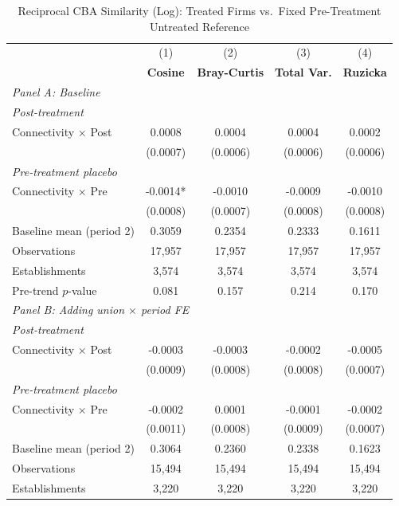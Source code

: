 \begin{table}[H]
\centering
\caption{Reciprocal CBA Similarity (Log): Treated Firms vs.\ Fixed Pre-Treatment Untreated Reference}
\label{tab:treated_pretreat_ref_ln_cba_similarity}
\scriptsize
\setlength{\tabcolsep}{8pt}
\begin{tabular}{lcccc}
\toprule\toprule
 & (1) & (2) & (3) & (4) \\
 & \textbf{Cosine} & \textbf{Bray-Curtis} & \textbf{Total Var.} & \textbf{Ruzicka} \\
\midrule
\multicolumn{5}{l}{\textit{Panel A: Baseline}} \\
\multicolumn{5}{l}{\textit{Post-treatment}} \\
Connectivity $\times$ Post & 0.0008 & 0.0004 & 0.0004 & 0.0002 \\
 & (0.0007) & (0.0006) & (0.0006) & (0.0006) \\
\multicolumn{5}{l}{\textit{Pre-treatment placebo}} \\
Connectivity $\times$ Pre & -0.0014* & -0.0010 & -0.0009 & -0.0010 \\
 & (0.0008) & (0.0007) & (0.0008) & (0.0008) \\
\midrule
Baseline mean (period 2) & 0.3059 & 0.2354 & 0.2333 & 0.1611 \\
Observations &       17,957 &       17,957 &       17,957 &       17,957 \\
Establishments &        3,574 &        3,574 &        3,574 &        3,574 \\
Pre-trend $p$-value & 0.081 & 0.157 & 0.214 & 0.170 \\
\midrule
\multicolumn{5}{l}{\textit{Panel B: Adding union $\times$ period FE}} \\
\multicolumn{5}{l}{\textit{Post-treatment}} \\
Connectivity $\times$ Post & -0.0003 & -0.0003 & -0.0002 & -0.0005 \\
 & (0.0009) & (0.0008) & (0.0008) & (0.0007) \\
\multicolumn{5}{l}{\textit{Pre-treatment placebo}} \\
Connectivity $\times$ Pre & -0.0002 & 0.0001 & -0.0001 & -0.0002 \\
 & (0.0011) & (0.0008) & (0.0009) & (0.0007) \\
\midrule
Baseline mean (period 2) & 0.3064 & 0.2360 & 0.2338 & 0.1623 \\
Observations &       15,494 &       15,494 &       15,494 &       15,494 \\
Establishments &        3,220 &        3,220 &        3,220 &        3,220 \\

\end{tabular}
\end{table}
